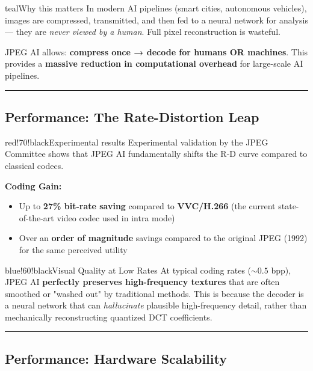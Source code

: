 \begin{calloutbox}{teal}{Why this matters}
In modern AI pipelines (smart cities, autonomous vehicles), images are compressed, transmitted, and then fed to a neural network for analysis — they are \textit{never viewed by a human}. Full pixel reconstruction is wasteful.

JPEG AI allows: \textbf{compress once → decode for humans OR machines}. This provides a \textbf{massive reduction in computational overhead} for large-scale AI pipelines.
\end{calloutbox}

\bigskip\hrule\bigskip

\subsection{Performance: The Rate-Distortion Leap}

\begin{calloutbox}{red!70!black}{Experimental results}
Experimental validation by the JPEG Committee shows that JPEG AI fundamentally shifts the R-D curve compared to classical codecs.

\textbf{Coding Gain:}
\begin{itemize}
\item Up to \textbf{27\% bit-rate saving} compared to \textbf{VVC/H.266} (the current state-of-the-art video codec used in intra mode)
\item Over an \textbf{order of magnitude} savings compared to the original JPEG (1992) for the same perceived utility
\end{itemize}
\end{calloutbox}

\begin{calloutbox}{blue!60!black}{Visual Quality at Low Rates}
At typical coding rates ($\sim 0.5$ bpp), JPEG AI \textbf{perfectly preserves high-frequency textures} that are often smoothed or "washed out" by traditional methods. This is because the decoder is a neural network that can \textit{hallucinate} plausible high-frequency detail, rather than mechanically reconstructing quantized DCT coefficients.
\end{calloutbox}

\bigskip\hrule\bigskip

\subsection{Performance: Hardware Scalability}

